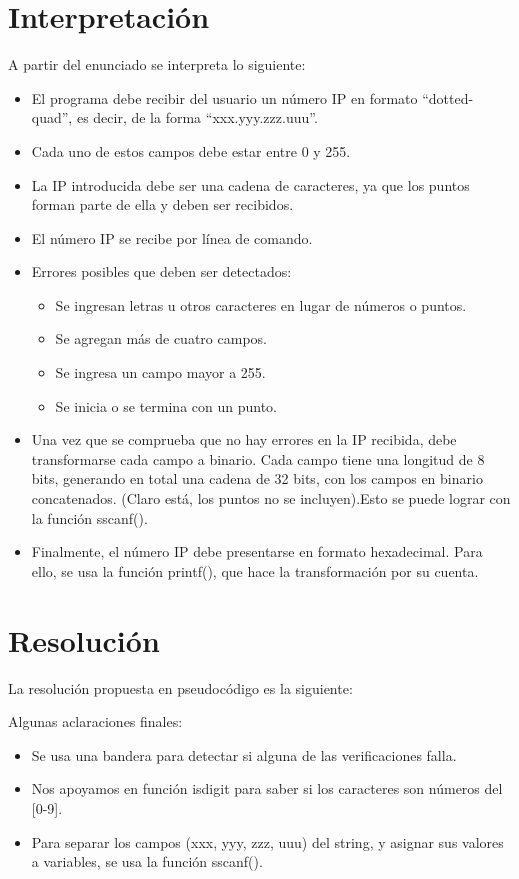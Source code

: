 \documentclass[12pt,a4paper]{article} %
\begin{document}
	\section{Interpretación}
	A partir del enunciado se interpreta lo siguiente:\par
	\begin{itemize}
	\item El programa debe recibir del usuario un número IP en formato “dotted-quad”, es decir, de la forma “xxx.yyy.zzz.uuu”.
    \item Cada uno de estos campos debe estar entre 0 y 255.\par
    \item La IP introducida debe ser una cadena de caracteres, ya que los puntos forman parte de ella y deben ser recibidos.
    \item El número IP se recibe por línea de comando.
    \item Errores posibles que deben ser detectados:
    	\begin{itemize}
    	\item Se ingresan letras u otros caracteres en lugar de números o puntos.
        \item Se agregan más de cuatro campos. 
        \item Se ingresa un campo mayor a 255.
        \item Se inicia o se termina con un punto.
    	\end{itemize}
        
    \item Una vez que se comprueba que no hay errores en la IP recibida, debe transformarse cada campo a binario. Cada campo tiene una longitud de 8 bits, generando en total una cadena de 32 bits, con los campos en binario concatenados. (Claro está, los puntos no se incluyen).Esto se puede lograr con la función sscanf().
    \item Finalmente, el número IP debe presentarse en formato hexadecimal. Para ello, se usa la función printf(), que hace la transformación por su cuenta.
	\end{itemize}
	\clearpage
\section{Resolución}
La resolución propuesta en pseudocódigo es la siguiente:\par
    \lstset{inputencoding=utf8/latin1, style = customc}
    
    Algunas aclaraciones finales:\par
    \begin{itemize}
    	\item Se usa una bandera para detectar si alguna de las verificaciones falla.\par
    	\item Nos apoyamos en función isdigit para saber si los caracteres son números del [0-9].\par
    	\item Para separar los campos (xxx, yyy, zzz, uuu) del string, y asignar sus valores a variables, se usa la función sscanf().\par
    \end{itemize}
\end{document}
